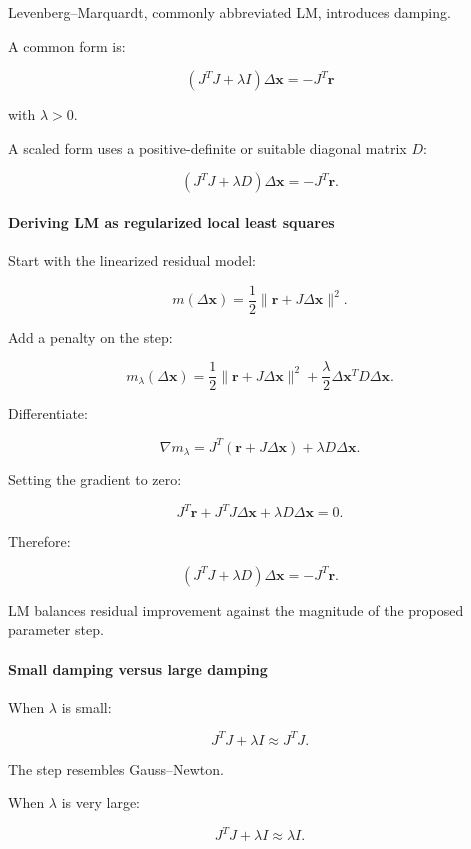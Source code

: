 Levenberg--Marquardt, commonly abbreviated LM, introduces damping.

A common form is:

\[
\boxed{ (J^TJ+\lambda I)\Delta\mathbf x=-J^T\mathbf r }
\]

with \(\lambda>0\).

A scaled form uses a positive-definite or suitable diagonal matrix \(D\):

\[
\boxed{ (J^TJ+\lambda D)\Delta\mathbf x=-J^T\mathbf r. }
\]

\paragraph{Deriving LM as regularized local least squares}\label{02-foundations-ii-ch027-deriving-lm-as-regularized-local-least-squares}

Start with the linearized residual model:

\[
m(\Delta\mathbf x) = \frac12\|\mathbf r+J\Delta\mathbf x\|^2.
\]

Add a penalty on the step:

\[
m_\lambda(\Delta\mathbf x) = \frac12\|\mathbf r+J\Delta\mathbf x\|^2 +\frac\lambda2\Delta\mathbf x^TD\Delta\mathbf x.
\]

Differentiate:

\[
\nabla m_\lambda= J^T(\mathbf r+J\Delta\mathbf x) +\lambda D\Delta\mathbf x.
\]

Setting the gradient to zero:

\[
J^T\mathbf r+ J^TJ\Delta\mathbf x+ \lambda D\Delta\mathbf x=0.
\]

Therefore:

\[
\boxed{ (J^TJ+\lambda D)\Delta\mathbf x=-J^T\mathbf r }.
\]

LM balances residual improvement against the magnitude of the proposed parameter step.

\paragraph{Small damping versus large damping}\label{02-foundations-ii-ch027-small-damping-versus-large-damping}

When \(\lambda\) is small:

\[
J^TJ+\lambda I\approx J^TJ.
\]

The step resembles Gauss--Newton.

When \(\lambda\) is very large:

\[
J^TJ+\lambda I\approx\lambda I.
\]

